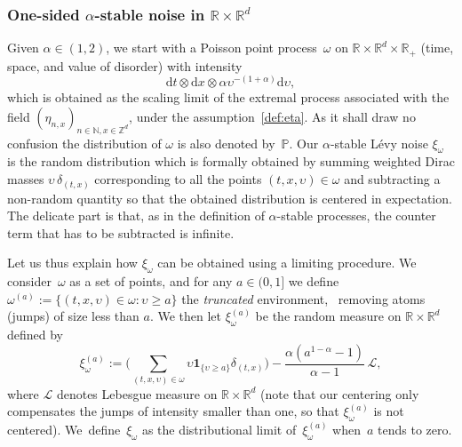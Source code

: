\documentclass[10pt]{amsart}
\let\mathcal\mathscr
\let\sep:
\theoremstyle{definition}
\newcommand{\dd}{\mathrm{d}}
\newcommand{\ind}{\mathbf{1}}
\newcommand{\cL}{{\ensuremath{\mathcal L}} }
\newcommand{\bbN}{{\ensuremath{\mathbb N}} }
\newcommand{\bbP}{{\ensuremath{\mathbb P}} }
\newcommand{\bbR}{{\ensuremath{\mathbb R}} }
\newcommand{\bbZ}{{\ensuremath{\mathbb Z}} }
\let\ups\upsilon
\let\go\omega
\begin{document}
\subsubsection*{One-sided $\alpha$-stable noise in $\bbR\times \bbR^d$}
Given $\alpha\in(1,2)$, we start with a Poisson
point process~$\go$ on $\bbR\times \bbR^d\times \bbR_+$ (time, space, and value of disorder) with intensity
\begin{equation}
\label{Poissondens}
\dd t \otimes \dd x \otimes \alpha \ups^{-(1+\alpha)} \dd \ups,
\end{equation}
which is obtained as the scaling limit of the extremal process associated with the field $(\eta_{n,x})_{n \in \bbN, x\in \bbZ^d}$, under the assumption~\eqref{def:eta}.
As it shall draw no confusion the distribution of $\go$ is also denoted by~$\bbP$.
Our $\alpha$-stable Lévy noise $\xi_{\go}$ is the random distribution which is formally obtained by summing weighted Dirac masses $\ups\,\delta_{(t,x)}$ corresponding to all the points $(t,x,\ups)\in \go$ and subtracting a non-random quantity so that the obtained distribution is centered in expectation. The delicate part is that, as in the definition of $\alpha$-stable processes, the counter term that has to be subtracted is infinite.

Let us thus explain how $\xi_{\go}$ can be obtained using a limiting procedure.
We consider~$\go$ as a set of points, and for any $a\in(0,1]$ we define $\go^{(a)}:=\{ (t,x,\ups)\in \go \sep \ups\ge a\}$ the \emph{truncated} environment, \ie \ removing atoms (jumps) of size less than $a$.
We then let $\xi_{\go}^{(a)}$ be the random measure on $\bbR\times \bbR^d$ defined by
\begin{equation}
\label{def:omegabar}
\xi_{\go}^{(a)}:= \bigg(\sum_{(t,x,\ups)\in \go} \ups\ind_{\{\ups \ge a\}} \delta_{(t,x)} \bigg)- \frac{ \alpha (a^{1-\alpha}-1)}{\alpha-1} \, \cL,
\end{equation}
where $\cL$ denotes Lebesgue measure on $\bbR\times \bbR^d$
(note that our centering only compensates the jumps of intensity smaller than one, so that $\xi_{\go}^{(a)}$ is
not centered).
We~de\-fine~$\xi_{\go}$ as the distributional limit of~$ \xi_{\go}^{(a)}$ when~$a$ tends to zero.
\end{document}
